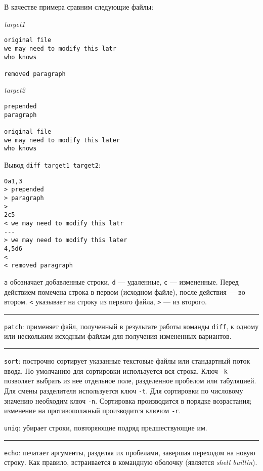 \documentclass[listings]{labreport}
\begin{document}
В качестве примера сравним следующие файлы:

\begin{multicols}{2}
\noindent\textit{target1}
\begin{verbatim}
original file
we may need to modify this latr
who knows

removed paragraph

\end{verbatim}

\noindent\textit{target2}
\begin{verbatim}
prepended
paragraph

original file
we may need to modify this later
who knows
\end{verbatim}
\end{multicols}

Вывод \texttt{diff target1 target2}:

\begin{verbatim}
0a1,3
> prepended
> paragraph
> 
2c5
< we may need to modify this latr
---
> we may need to modify this later
4,5d6
< 
< removed paragraph
\end{verbatim}

\texttt{a} обозначает добавленные строки, \texttt{d} — удаленные, \texttt{c} —
измененные. Перед действием помечена строка в первом (исходном файле),
после действия — во втором. \texttt{<} указывает на строку из первого файла,
\texttt{>} — из второго.

\noindent\rule{\textwidth}{1pt}

\texttt{patch}: применяет файл, полученный в результате работы команды \texttt{diff},
к одному или нескольким исходным файлам для получения измененных вариантов.

\noindent\rule{\textwidth}{1pt}

\texttt{sort}: построчно сортирует указанные текстовые файлы или стандартный поток ввода.
По умолчанию для сортировки используется вся строка. Ключ \texttt{-k} позволяет
выбрать из нее отдельное поле, разделенное пробелом или табуляцией. Для смены разделителя
используется ключ \texttt{-t}. Для сортировки по числовому значению необходим ключ \texttt{-n}.
Сортировка производится в порядке возрастания; изменение на противополжный производится ключом \texttt{-r}.

\texttt{uniq}: убирает строки, повторяющие подряд предшествующие им.

\noindent\rule{\textwidth}{1pt}

\texttt{echo}: печатает аргументы, разделяя их пробелами, завершая переходом на новую строку. Как
правило, встраивается в командную оболочку (является \textit{shell builtin}).
\end{document}
